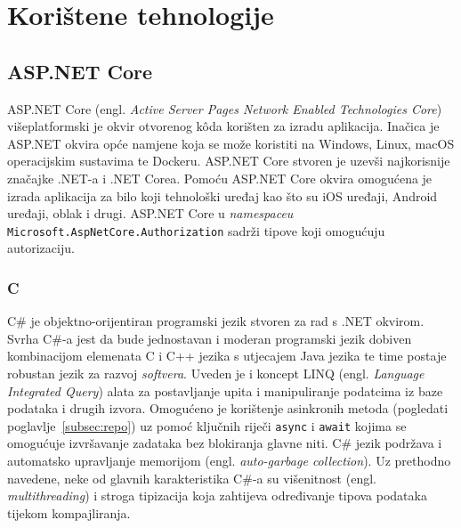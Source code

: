 \section{Korištene tehnologije}

\subsection{ASP.NET Core}

ASP.NET Core (engl. \textit{Active Server Pages Network Enabled Technologies Core}) višeplatformski je okvir otvorenog k\^oda korišten za izradu aplikacija. Inačica je ASP.NET okvira opće namjene koja se može koristiti na Windows, Linux, macOS operacijskim sustavima te Dockeru. ASP.NET Core stvoren je uzevši najkorisnije značajke .NET-a i .NET Corea. Pomoću ASP.NET Core okvira omogućena je izrada aplikacija za bilo koji tehnološki uređaj kao što su iOS uređaji, Android uređaji, oblak i drugi. ASP.NET Core u \textit{namespaceu} \texttt{Microsoft.AspNetCore.Authorization} sadrži tipove koji omogućuju autorizaciju.


\subsubsection{C}
C\# je objektno-orijentiran programski jezik stvoren za rad s .NET okvirom. Svrha C\#-a jest da bude jednostavan i moderan programski jezik dobiven kombinacijom elemenata C i C++ jezika s utjecajem Java jezika te time postaje robustan jezik za razvoj \textit{softvera}. Uveden je i koncept LINQ (engl. \textit{Language Integrated Query}) alata za postavljanje upita i manipuliranje podatcima iz baze podataka i drugih izvora. Omogućeno je korištenje asinkronih metoda (pogledati poglavlje~\ref{subsec:repo}) uz pomoć ključnih riječi \texttt{async} i \texttt{await} kojima se omogućuje izvršavanje zadataka bez blokiranja glavne niti. C\# jezik podržava i automatsko upravljanje memorijom (engl. \textit{auto-garbage collection}). Uz prethodno navedene, neke od glavnih karakteristika C\#-a su višenitnost (engl. \textit{multithreading}) i stroga tipizacija koja zahtijeva određivanje tipova podataka tijekom kompajliranja.


